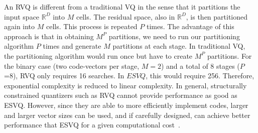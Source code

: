 \documentclass{article}
\begin{document}
An RVQ is different from a traditional VQ in the sense that it partitions the input space $\mathbb{R}^D$ into $M$ cells.  The residual space, also in $\mathbb{R}^D$, is then partitioned again into $M$ cells.  This process is repeated $P$ times.  The advantage of this approach is that in obtaining $M^P$ partitions, we need to run our partitioning algorithm $P$ times and generate $M$ partitions at each stage.  In traditional VQ, the partitioning algorithm would run once but have to create $M^P$ partitions.  For the binary case (two code-vectors per stage, $M=2$) and a total of 8 stages ($P$=8), RVQ only requires 16 searches.  In $ESVQ$, this would require 256.  Therefore, exponential complexity is reduced to linear complexity.  In general, structurally constrained quantizers such as RVQ cannot provide performance as good as ESVQ.  However, since they are able to more efficiently implement codes, larger and larger vector sizes can be used, and if carefully designed, can achieve better performance that ESVQ for a given computational cost~\cite{1996_JNL_AdvancesRVQ_Barnes}.
\end{document}
